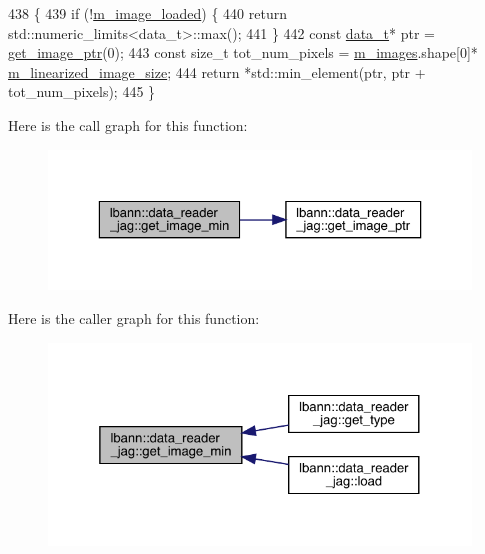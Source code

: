 \begin{DoxyCode}
438                                                            \{
439   \textcolor{keywordflow}{if} (!\hyperlink{classlbann_1_1data__reader__jag_a3f1691818996f73dc918dfd0e8f98a70}{m\_image\_loaded}) \{
440     \textcolor{keywordflow}{return} std::numeric\_limits<data\_t>::max();
441   \}
442   \textcolor{keyword}{const} \hyperlink{classlbann_1_1data__reader__jag_a7377d6c02c455f019a378489b9b8eab4}{data\_t}* ptr = \hyperlink{classlbann_1_1data__reader__jag_aab51581a1b8175bf5da1b74454ef7701}{get\_image\_ptr}(0);
443   \textcolor{keyword}{const} \textcolor{keywordtype}{size\_t} tot\_num\_pixels = \hyperlink{classlbann_1_1data__reader__jag_ae96696fb14653ef1b57936943eb6a800}{m\_images}.shape[0]*
      \hyperlink{classlbann_1_1data__reader__jag_a7c2aa5f489e7c7a3236c1f6c4a760048}{m\_linearized\_image\_size};
444   \textcolor{keywordflow}{return} *std::min\_element(ptr, ptr + tot\_num\_pixels);
445 \}
\end{DoxyCode}
Here is the call graph for this function\+:\nopagebreak
\begin{figure}[H]
\begin{center}
\leavevmode
\includegraphics[width=329pt]{classlbann_1_1data__reader__jag_a7fd3f8e1b26f624bc91fac8fe4cff85e_cgraph}
\end{center}
\end{figure}
Here is the caller graph for this function\+:\nopagebreak
\begin{figure}[H]
\begin{center}
\leavevmode
\includegraphics[width=325pt]{classlbann_1_1data__reader__jag_a7fd3f8e1b26f624bc91fac8fe4cff85e_icgraph}
\end{center}
\end{figure}
\mbox{\label{classlbann_1_1data__reader__jag_aab51581a1b8175bf5da1b74454ef7701}} 
